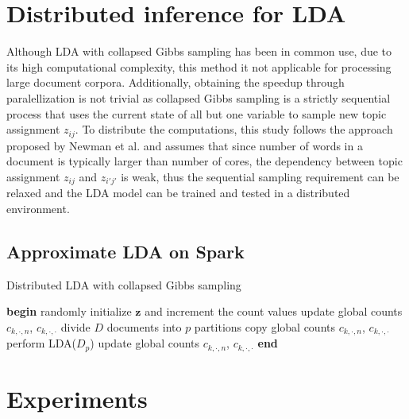 \documentclass[journal]{IEEEtran}
\begin{document}
\section{Distributed inference for LDA}
\label{sec:slda}
Although LDA with collapsed Gibbs sampling has been in common use, due to its high computational complexity, this method it not applicable for processing large document corpora. Additionally, obtaining the speedup through paralellization is not trivial as collapsed Gibbs sampling is a strictly sequential process that uses the current state of all but one variable to sample new topic assignment $z_{ij}$. To distribute the computations, this study follows the approach proposed by Newman et al.\cite{newman2009distributed} and assumes that since number of words in a document is typically larger than number of cores, the dependency between topic assignment $z_{ij}$ and $z_{i'j'}$ is weak, thus the sequential sampling requirement can be relaxed and the LDA model can be trained and tested in a distributed environment.

\subsection{Approximate LDA on Spark}

 \begin{algorithm}
\caption{Distributed LDA with collapsed Gibbs sampling}
\label{alg2}
\begin{algorithmic}
\scriptsize
\State \textbf{begin}
\State randomly initialize $\textbf{z}$ and increment the count values
\State update global counts $c_{k,\cdot,n}$, $c_{k,\cdot,\cdot}$
\State divide $D$ documents into $p$ partitions
   	  \State copy global counts $c_{k,\cdot,n}$, $c_{k,\cdot,\cdot}$
   	  \State perform LDA($D_p$)
   \EndFor
   \State update global counts $c_{k,\cdot,n}$, $c_{k,\cdot,\cdot}$
  \EndFor
\State \textbf{end}
\end{algorithmic}
\end{algorithm}


\section{Experiments}
\label{sec:exp}
\end{document}
